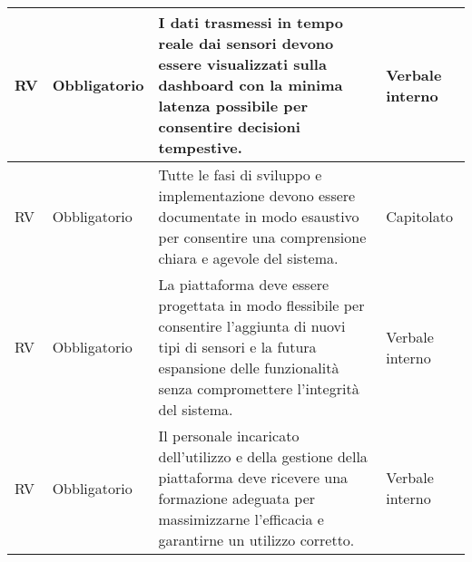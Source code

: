 \begin{longtable}{|C{1cm}|C{2cm}|>{\raggedright}m{5cm}|C{2cm}|}
    \hline
     RV & Obbligatorio        & I dati trasmessi in tempo reale dai sensori devono essere visualizzati sulla dashboard con la minima latenza possibile per consentire decisioni tempestive.                                        & Verbale interno \\
    \hline
     RV & Obbligatorio        & Tutte le fasi di sviluppo e implementazione devono essere documentate in modo esaustivo per consentire una comprensione chiara e agevole del sistema.                                              & Capitolato      \\
    \hline
     RV & Obbligatorio        & La piattaforma deve essere progettata in modo flessibile per consentire l'aggiunta di nuovi tipi di sensori e la futura espansione delle funzionalità senza compromettere l'integrità del sistema. & Verbale interno \\
    \hline
     RV & Obbligatorio        & Il personale incaricato dell'utilizzo e della gestione della piattaforma deve ricevere una formazione adeguata per massimizzarne l'efficacia e garantirne un utilizzo corretto.                    & Verbale interno \\
    \hline
\end{longtable}



